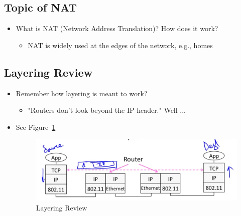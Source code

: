 \documentclass[12pt]{ctexart}   %
\begin{document}
	\subsection{Topic of NAT}
	\begin{itemize}
		\item What is NAT (Network Address Translation)? How does it work?
		\begin{itemize}
			\item NAT is widely used at the edges of the network, e.g., homes
		\end{itemize}
	\end{itemize}
	
	\subsection{Layering Review}
	\begin{itemize}
		\item Remember how layering is meant to work?
		\begin{itemize}
			\item "Routers don't look beyond the IP header." Well ...
		\end{itemize}
		\item See Figure~\ref{fig:4-10-1}
		
		\begin{figure}[h!] %
		\centering
		 \includegraphics[scale=0.7]{images/4-10-1}
		\caption{ Layering Review }
		 \label{fig:4-10-1}
		 \end{figure}
	\end{itemize}
	
\end{document}
